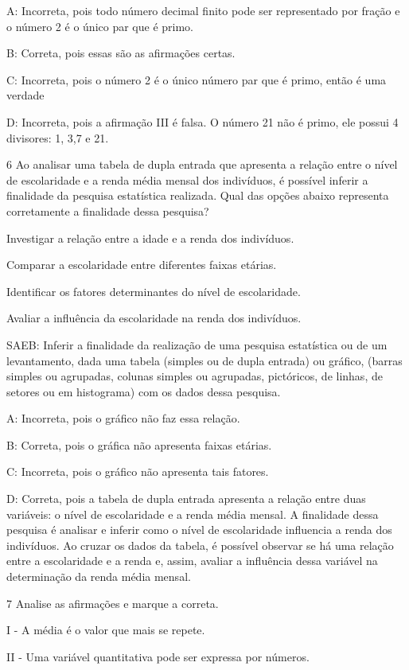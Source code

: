 {A: Incorreta, pois todo número decimal finito pode ser representado por
fração e o número 2 é o único par que é primo.

B: Correta, pois essas são as afirmações certas.

C: Incorreta, pois o número 2 é o único número par que é primo, então é
uma verdade

D: Incorreta, pois a afirmação III é falsa. O número 21 não é primo, ele
possui 4 divisores: 1, 3,7 e 21.

\num{6} Ao analisar uma tabela de dupla entrada que apresenta a relação entre
o nível de escolaridade e a renda média mensal dos indivíduos, é
possível inferir a finalidade da pesquisa estatística realizada. Qual
das opções abaixo representa corretamente a finalidade dessa pesquisa?
\item Investigar a relação entre a idade e a renda dos indivíduos.
\item Comparar a escolaridade entre diferentes faixas etárias.
\item Identificar os fatores determinantes do nível de escolaridade.
\item Avaliar a influência da escolaridade na renda dos indivíduos.

SAEB: Inferir a finalidade da realização de uma pesquisa estatística ou
de um levantamento, dada uma tabela (simples ou de dupla entrada) ou
gráfico, (barras simples ou agrupadas, colunas simples ou agrupadas,
pictóricos, de linhas, de setores ou em histograma) com os dados dessa
pesquisa.

A: Incorreta, pois o gráfico não faz essa relação.

B: Correta, pois o gráfica não apresenta faixas etárias.

C: Incorreta, pois o gráfico não apresenta tais fatores.

D: Correta, pois a tabela de dupla entrada apresenta a relação entre
duas variáveis: o nível de escolaridade e a renda média mensal. A
finalidade dessa pesquisa é analisar e inferir como o nível de
escolaridade influencia a renda dos indivíduos. Ao cruzar os dados da
tabela, é possível observar se há uma relação entre a escolaridade e a
renda e, assim, avaliar a influência dessa variável na determinação da
renda média mensal.

\num{7} Analise as afirmações e marque a correta.

I - A média é o valor que mais se repete.

II - Uma variável quantitativa pode ser expressa por números.

}

